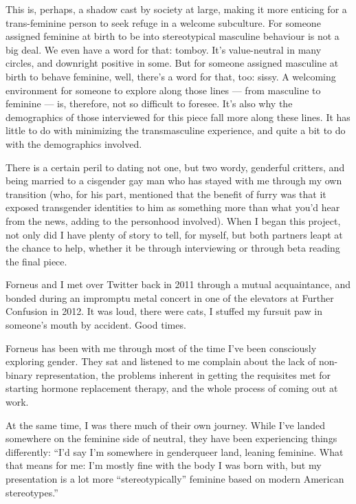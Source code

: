 This is, perhaps, a shadow cast by society at large, making it more enticing for a trans-feminine person to seek refuge in a welcome subculture.  For someone assigned feminine at birth to be into stereotypical masculine behaviour is not a big deal.  We even have a word for that: tomboy.  It's value-neutral in many circles, and downright positive in some.  But for someone assigned masculine at birth to behave feminine, well, there's a word for that, too: sissy.  A welcoming environment for someone to explore along those lines --- from masculine to feminine --- is, therefore, not so difficult to foresee.  It's also why the demographics of those interviewed for this piece fall more along these lines.  It has little to do with minimizing the transmasculine experience, and quite a bit to do with the demographics involved.

\secdiv

There is a certain peril to dating not one, but two wordy, genderful critters, and being married to a cisgender gay man who has stayed with me through my own transition (who, for his part, mentioned that the benefit of furry was that it exposed transgender identities to him as something more than what you'd hear from the news, adding to the personhood involved).  When I began this project, not only did I have plenty of story to tell, for myself, but both partners leapt at the chance to help, whether it be through interviewing or through beta reading the final piece.

Forneus and I met over Twitter back in 2011 through a mutual acquaintance, and bonded during an impromptu metal concert in one of the elevators at Further Confusion in 2012.  It was loud, there were cats, I stuffed my fursuit paw in someone's mouth by accident.  Good times.

Forneus has been with me through most of the time I've been consciously exploring gender.  They sat and listened to me complain about the lack of non-binary representation, the problems inherent in getting the requisites met for starting hormone replacement therapy, and the whole process of coming out at work.

At the same time, I was there much of their own journey.  While I've landed somewhere on the feminine side of neutral, they have been experiencing things differently: ``I'd say I'm somewhere in genderqueer land, leaning feminine. What that means for me: I'm mostly fine with the body I was born with, but my presentation is a lot more ``stereotypically'' feminine based on modern American stereotypes.''

